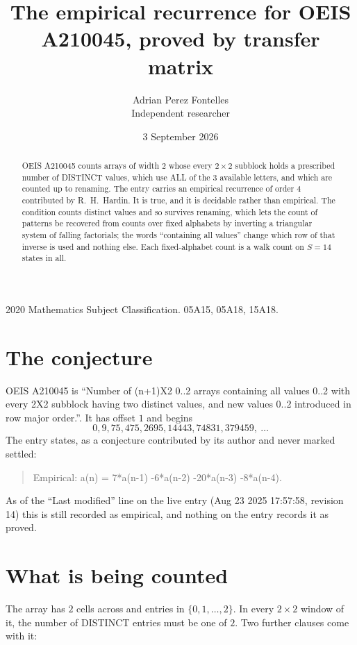 \documentclass[11pt,a4paper]{article}
\title{The empirical recurrence for OEIS A210045, proved by transfer matrix}
\author{Adrian Perez Fontelles\\ \small Independent researcher}
\date{3 September 2026}
\theoremstyle{plain}
\theoremstyle{definition}
\begin{document}
\maketitle

\begin{abstract}
OEIS A210045 counts arrays of width $2$ whose every $2\times2$ subblock holds a
prescribed number of DISTINCT values, which use ALL of the $3$ available letters, and which
are counted up to renaming. The entry carries an empirical recurrence of order $4$
contributed by R.~H.~Hardin. It is true, and it is decidable rather than empirical. The
condition counts distinct values and so survives renaming, which lets the count of patterns be
recovered from counts over fixed alphabets by inverting a triangular system of falling
factorials; the words ``containing all values'' change which row of that inverse is used and
nothing else. Each fixed-alphabet count is a walk count on $S=14$ states in all.
\end{abstract}

\noindent\small 2020 Mathematics Subject Classification. 05A15, 05A18, 15A18.\normalsize

\section{The conjecture}

OEIS A210045 is ``Number of (n+1)X2 0..2 arrays containing all values 0..2 with every 2X2 subblock having two distinct values, and new values 0..2 introduced in row major order.''. It has offset $1$ and begins
\[
0, 9, 75, 475, 2695, 14443, 74831, 379459,\ \dots
\]
The entry states, as a conjecture contributed by its author and never marked settled:
\begin{quote}
Empirical: a(n) = 7*a(n-1) -6*a(n-2) -20*a(n-3) -8*a(n-4).
\end{quote}
As of the ``Last modified'' line on the live entry (Aug 23 2025 17:57:58, revision 14) this is still
recorded as empirical, and nothing on the entry records it as proved.

\section{What is being counted}

The array has $2$ cells across and entries in $\{0,1,\dots,2\}$. In every
$2\times2$ window of it, the number of DISTINCT entries must be one of $2$. Two
further clauses come with it:
\end{document}
